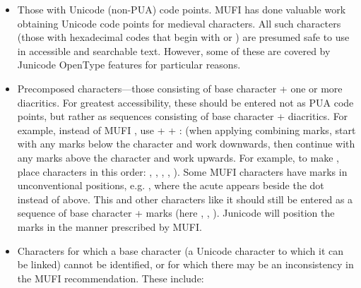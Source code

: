 \liststyleLi
\begin{itemize}
\item Those with Unicode (non-PUA) code points. MUFI has done valuable work obtaining Unicode code points for medieval characters.
All such characters (those with hexadecimal codes that  begin with 
or ) are presumed safe to use in accessible and searchable text. However, some of these are
covered by Junicode OpenType features for particular reasons.
\item Precomposed characters—those consisting of base character + one or more diacritics. For greatest accessibility,
these should be entered not as PUA code points, but rather as sequences consisting of base character +
diacritics. For example, instead of MUFI  , use
 +   +  :
 (when applying combining marks, start with any marks below the character and work
downwards, then continue with any marks above the character and work upwards. For example, to make
, place characters in this order: ,
 ,  ,  ,  ). Some MUFI characters have marks in unconventional positions,
e.g.  , where the
acute appears beside the dot instead of above. This and other characters like it should still be entered as a sequence
of base character + marks (here ,  ,
 ). Junicode will position the marks in the manner prescribed by MUFI.
\item Characters for which a base character (a Unicode character to which it can be linked) cannot be identified, or for
which there may be an inconsistency in the MUFI recommendation. These include:


\end{itemize}
